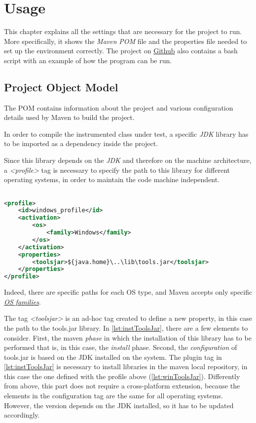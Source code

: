 \chapter{Usage}\label{ch:usage}

This chapter explains all the settings that are necessary for the project to run. More specifically, it shows the \textit{Maven} \textit{POM} file and the properties file needed to set up the environment correctly. The project on \href{\projRoot}{Github} also contains a bash script with an example of how the program can be run.

\section{Project Object Model}\label{sec:pom}

The POM contains information about the project and various configuration details used by Maven to build the project.

In order to compile the instrumented class under test, a specific \emph{JDK} library has to be imported as a dependency inside the project. 

Since this library depends on the \emph{JDK} and therefore on the machine architecture, a \emph{<profile>} tag is necessary to specify the path to this library for different operating systems, in order to maintain the code machine independent.

\begin{lstlisting}[language=XML,caption={Windows default profile for jdk lib},label={lst:winToolsJar}]% Start your code-block

<profile>
	<id>windows_profile</id>
	<activation>
		<os>
			<family>Windows</family>
		</os>
	</activation>
	<properties>
		<toolsjar>${java.home}\..\lib\tools.jar</toolsjar>
	</properties>
</profile>
\end{lstlisting}

Indeed, there are specific paths for each OS type, and Maven accepts only specific \href{http://maven.apache.org/enforcer/enforcer-rules/requireOS.html}{\textit{OS families}}.

The tag \textit{<toolsjar>} is an ad-hoc tag created to define a new property, in this case the path to the tools.jar library. In \autoref{lst:instToolsJar}, there are a few elements to consider. First, the maven \textit{phase} in which the installation of this library has to be performed that is, in this case, the \textit{install} phase. Second, the \textit{configuration} of tools.jar is based on the JDK installed on the system. The  plugin tag in \autoref{lst:instToolsJar} is necessary to install libraries in the maven local repository, in this case the one defined with the profile above (\autoref{lst:winToolsJar}). Differently from above, this part does not require a cross-platform extension, because the elements in the configuration tag are the same for all operating systems. However, the version depends on the JDK installed, so it has to be updated accordingly.

